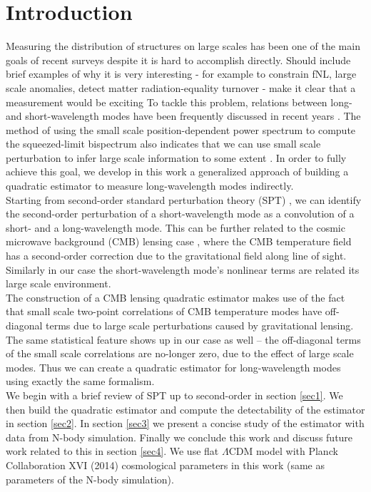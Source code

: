 \documentclass[prd,amsmath,amssymb,floatfix,superscriptaddress,nofootinbib,twocolumn]{revtex4-1}
\newcommand{\RC}[1]{{\color{darkorange} #1}}
\begin{document}
\section{Introduction}
Measuring the distribution of structures on large scales has been one of the main goals of recent surveys despite it is hard to accomplish directly.
\RC{Should include brief examples of why it is very interesting - for example
  to constrain fNL, large scale anomalies, detect matter radiation-equality turnover - make it clear that a measurement would be exciting}
To tackle this problem, relations between long- and short-wavelength modes have been frequently discussed in recent years \cite{Baldauf:2011fer}\cite{Barreira:2017res}. The method of using the small scale position-dependent power spectrum to compute the squeezed-limit bispectrum also indicates that we can use small scale perturbation to infer large scale information to some extent \cite{Chiang:2014pos}\cite{Chiang:2015poss}. In order to fully achieve this goal, we develop in this work a generalized approach of building a quadratic estimator to measure long-wavelength modes indirectly. \\
Starting from second-order standard perturbation theory (SPT) \cite{Goroff:1986sts}\cite{Makino:1992fs}\cite{Jain:1994sop}, we can identify the second-order perturbation of a short-wavelength mode as a convolution of a short- and a long-wavelength mode. This can be further related to the cosmic microwave background (CMB) lensing case \cite{Hu:2002mr}, where the CMB temperature field has a second-order correction due to the gravitational field along line of sight. Similarly in our case the short-wavelength mode's nonlinear terms are related its large scale environment.
\\
The construction of a CMB lensing quadratic estimator makes use of the fact that small scale two-point correlations of CMB temperature modes have off-diagonal terms due to large scale perturbations caused by gravitational lensing. The same statistical feature shows up in our case as well -- the off-diagonal terms of the small scale correlations are no-longer zero, due to the effect of large scale modes. Thus we can create a quadratic estimator for long-wavelength modes using exactly the same formalism. \\
We begin with a brief review of SPT up to second-order in section \ref{sec1}. We then build the quadratic estimator and compute the detectability of the estimator in section \ref{sec2}. In section \ref{sec3} we present a concise study of the estimator with data from N-body simulation. Finally we conclude this work and discuss future work related to this in section \ref{sec4}. We use flat $\Lambda$CDM model with Planck Collaboration XVI (2014) \cite{Planck:2014cos} cosmological parameters in this work (same as parameters of the N-body simulation).
\end{document}
